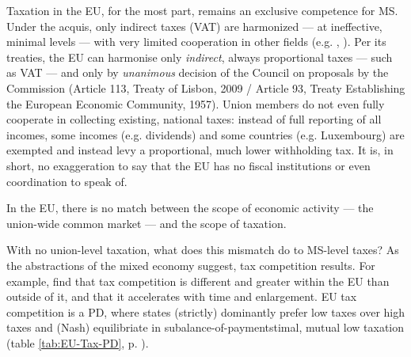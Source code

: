 \documentclass[11pt,a4paper,oneside,openright]{article}
\begin{document}


Taxation in the \gls{EU}, for the most part, remains an exclusive competence for \gls{MS}. Under the acquis, only indirect taxes (VAT) are harmonized --- at ineffective, minimal levels --- with very limited cooperation in other fields (e.g. \citealt{EuropeanCommission2009}, \citealt{TaxCoordinationandTaxCompetitionintheEuropeanUnion-EvaluatingtheCodeofConductonBusinessTaxation2001}). 
Per its treaties, the \gls{EU} can harmonise only \emph{indirect}, always proportional taxes --- such as \gls{VAT} --- and only by \emph{unanimous} decision of the Council on proposals by the Commission (Article 113, Treaty of Lisbon, 2009 / Article 93, Treaty Establishing the European Economic Community, 1957). 
Union members do not even fully cooperate in collecting existing, national taxes: 
instead of full reporting of all incomes, some incomes (e.g. dividends) and some countries (e.g. Luxembourg) are exempted and instead levy a proportional, much lower withholding tax. 
It is, in short, no exaggeration to say that the \gls{EU} has no fiscal institutions or even coordination to speak of.

In the \gls{EU}, there is no match between the scope of economic activity --- the union-wide common market --- and the scope of taxation. 

With no union-level taxation, what does this mismatch do to 
\gls{MS}-level taxes? 
As the abstractions of the mixed economy suggest, tax competition results. 
For example, \cite{Genschel2009} find that tax competition is different and greater within the \gls{EU} than outside of it, and that it accelerates with time and enlargement. 
\gls{EU} tax competition is a \gls{PD}, where states (strictly) dominantly prefer low taxes over high taxes and (Nash) equilibriate in subalance-of-paymentstimal, mutual low taxation (table \ref{tab:EU-Tax-PD}, p. \pageref{tab:EU-Tax-PD}).
\end{document}
